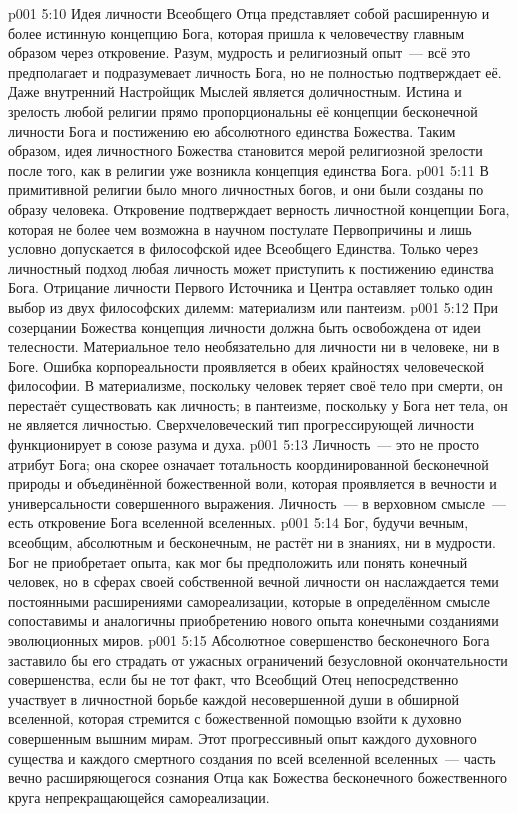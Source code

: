 \vs p001 5:10 \pc Идея личности Всеобщего Отца представляет собой расширенную и более истинную концепцию Бога, которая пришла к человечеству главным образом через откровение. Разум, мудрость и религиозный опыт~--- всё это предполагает и подразумевает личность Бога, но не полностью подтверждает её. Даже внутренний Настройщик Мыслей является доличностным. Истина и зрелость любой религии прямо пропорциональны её концепции бесконечной личности Бога и постижению ею абсолютного единства Божества. Таким образом, идея личностного Божества становится мерой религиозной зрелости после того, как в религии уже возникла концепция единства Бога.
\vs p001 5:11 В примитивной религии было много личностных богов, и они были созданы по образу человека. Откровение подтверждает верность личностной концепции Бога, которая не более чем возможна в научном постулате Первопричины и лишь условно допускается в философской идее Всеобщего Единства. Только через личностный подход любая личность может приступить к постижению единства Бога. Отрицание личности Первого Источника и Центра оставляет только один выбор из двух философских дилемм: материализм или пантеизм.
\vs p001 5:12 При созерцании Божества концепция личности должна быть освобождена от идеи телесности. Материальное тело необязательно для личности ни в человеке, ни в Боге. Ошибка корпореальности проявляется в обеих крайностях человеческой философии. В материализме, поскольку человек теряет своё тело при смерти, он перестаёт существовать как личность; в пантеизме, поскольку у Бога нет тела, он не является личностью. Сверхчеловеческий тип прогрессирующей личности функционирует в союзе разума и духа.
\vs p001 5:13 \pc Личность~--- это не просто атрибут Бога; она скорее означает тотальность координированной бесконечной природы и объединённой божественной воли, которая проявляется в вечности и универсальности совершенного выражения. Личность~--- в верховном смысле~--- есть откровение Бога вселенной вселенных.
\vs p001 5:14 \pc Бог, будучи вечным, всеобщим, абсолютным и бесконечным, не растёт ни в знаниях, ни в мудрости. Бог не приобретает опыта, как мог бы предположить или понять конечный человек, но в сферах своей собственной вечной личности он наслаждается теми постоянными расширениями самореализации, которые в определённом смысле сопоставимы и аналогичны приобретению нового опыта конечными созданиями эволюционных миров.
\vs p001 5:15 Абсолютное совершенство бесконечного Бога заставило бы его страдать от ужасных ограничений безусловной окончательности совершенства, если бы не тот факт, что Всеобщий Отец непосредственно участвует в личностной борьбе каждой несовершенной души в обширной вселенной, которая стремится с божественной помощью взойти к духовно совершенным вышним мирам. Этот прогрессивный опыт каждого духовного существа и каждого смертного создания по всей вселенной вселенных~--- часть вечно расширяющегося сознания Отца как Божества бесконечного божественного круга непрекращающейся самореализации.
